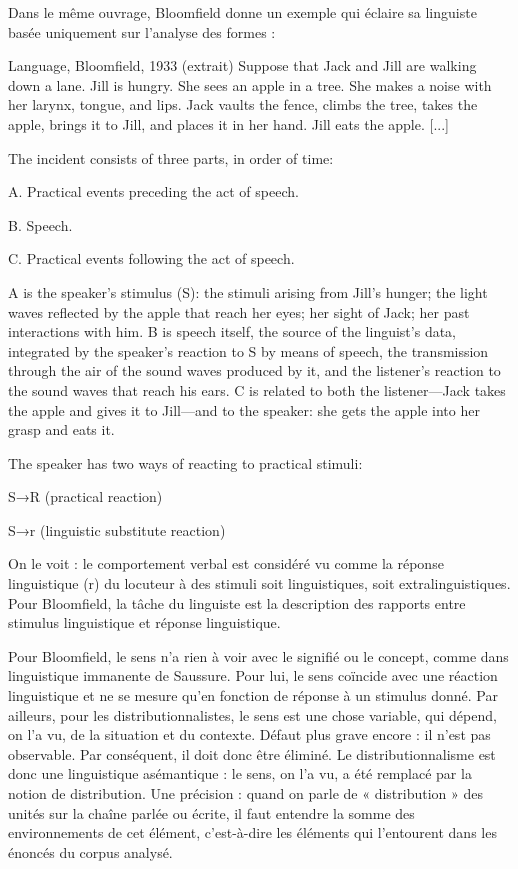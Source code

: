 Dans le même ouvrage, Bloomfield donne un exemple qui éclaire sa linguiste basée uniquement sur l’analyse des formes :\par


\begin{lecture}{Language, Bloomfield, 1933 (extrait)}
Suppose that Jack and Jill are walking down a lane. Jill is hungry. She sees an apple in a tree. She makes a noise with her larynx, tongue, and lips. Jack vaults the fence, climbs the tree, takes the apple, brings it to Jill, and places it in her hand. Jill eats the apple. [...]

The incident consists of three parts, in order of time:

A. Practical events preceding the act of speech.

B. Speech.

C. Practical events following the act of speech.

A is the speaker’s stimulus (S): the stimuli arising from Jill’s hunger; the light waves reflected by the apple that reach her eyes; her sight of Jack; her past interactions with him. B is speech itself, the source of the linguist’s data, integrated by the speaker’s reaction to S by means of speech, the transmission through the air of the sound waves produced by it, and the listener’s reaction to the sound waves that reach his ears. C is related to both the listener—Jack takes the apple and gives it to Jill—and to the speaker: she gets the apple into her grasp and eats it.

The speaker has two ways of reacting to practical stimuli:

S→R (practical reaction)

S→r (linguistic substitute reaction)
\end{lecture}


On le voit : le comportement verbal est considéré vu comme la réponse linguistique (r) du locuteur à des stimuli soit linguistiques, soit extralinguistiques. Pour Bloomfield, la tâche du linguiste est la description des rapports entre stimulus linguistique et réponse linguistique.\par


Pour Bloomfield, le sens n’a rien à voir avec le signifié ou le concept, comme dans linguistique immanente de Saussure. Pour lui, le sens coïncide avec une réaction linguistique et ne se mesure qu’en fonction de réponse à un stimulus donné. Par ailleurs, pour les distributionnalistes, le sens est une chose variable, qui dépend, on l’a vu, de la situation et du contexte. Défaut plus grave encore : il n’est pas observable. Par conséquent, il doit donc être éliminé. Le distributionnalisme est donc une linguistique asémantique : le sens, on l’a vu, a été remplacé par la notion de distribution. Une précision : quand on parle de « distribution » des unités sur la chaîne parlée ou écrite, il faut entendre la somme des environnements de cet élément, c’est-à-dire les éléments qui l’entourent dans les énoncés du corpus analysé.\par

